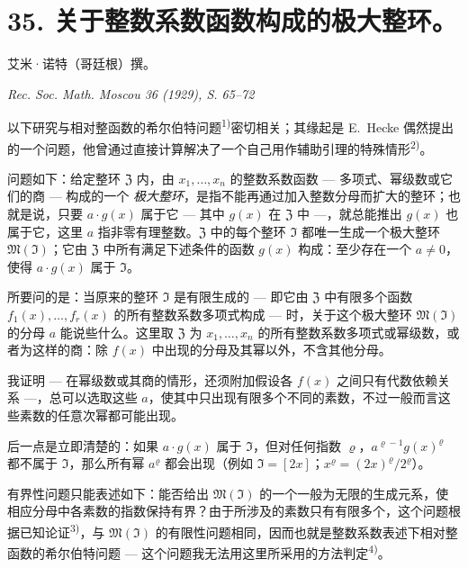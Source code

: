 \documentclass[11pt]{article}
\begin{document}
\setcounter{footnote}{0}
\section*{35. 关于整数系数函数构成的极大整环。}

\begin{center}
艾米·诺特（哥廷根）撰。\par
\emph{Rec. Soc. Math. Moscou 36 (1929), S. 65--72}
\end{center}




以下研究与相对整函数的希尔伯特问题\textsuperscript{1)}密切相关；其缘起是 E.\ Hecke 偶然提出的一个问题，他曾通过直接计算解决了一个自己用作辅助引理的特殊情形\textsuperscript{2)}。

问题如下：给定整环 $\mathfrak{Z}$ 内，由 $x_1,\ldots,x_n$ 的整数系数函数 --- 多项式、幂级数或它们的商 --- 构成的一个 \textit{极大整环}，是指不能再通过加入整数分母而扩大的整环；也就是说，只要 $a \cdot g(x)$ 属于它 --- 其中 $g(x)$ 在 $\mathfrak{Z}$ 中 ---，就总能推出 $g(x)$ 也属于它，这里 $a$ 指非零有理整数。$\mathfrak{Z}$ 中的每个整环 $\mathfrak{I}$ 都唯一生成一个极大整环 $\mathfrak{M}(\mathfrak{I})$；它由 $\mathfrak{Z}$ 中所有满足下述条件的函数 $g(x)$ 构成：至少存在一个 $a \neq 0$，使得 $a \cdot g(x)$ 属于 $\mathfrak{I}$。

所要问的是：当原来的整环 $\mathfrak{I}$ 是有限生成的 --- 即它由 $\mathfrak{Z}$ 中有限多个函数 $f_1(x),\ldots,f_r(x)$ 的所有整数系数多项式构成 --- 时，关于这个极大整环 $\mathfrak{M}(\mathfrak{I})$ 的分母 $a$ 能说些什么。这里取 $\mathfrak{Z}$ 为 $x_1,\ldots,x_n$ 的所有整数系数多项式或幂级数，或者为这样的商：除 $f(x)$ 中出现的分母及其幂以外，不含其他分母。

我证明 --- 在幂级数或其商的情形，还须附加假设各 $f(x)$ 之间只有代数依赖关系 ---，总可以选取这些 $a$，使其中只出现有限多个不同的素数，不过一般而言这些素数的任意次幂都可能出现。

后一点是立即清楚的：如果 $a\cdot g(x)$ 属于 $\mathfrak{I}$，但对任何指数 $\varrho$，$a^{\varrho-1}g(x)^{\varrho}$ 都不属于 $\mathfrak{I}$，那么所有幂 $a^{\varrho}$ 都会出现（例如 $\mathfrak{I}=[2x]$；$x^{\varrho}=(2x)^{\varrho}/2^{\varrho}$）。

有界性问题只能表述如下：能否给出 $\mathfrak{M}(\mathfrak{I})$ 的一个一般为无限的生成元系，使相应分母中各素数的指数保持有界？由于所涉及的素数只有有限多个，这个问题根据已知论证\textsuperscript{3)}，与 $\mathfrak{M}(\mathfrak{I})$ 的有限性问题相同，因而也就是整数系数表述下相对整函数的希尔伯特问题 --- 这个问题我无法用这里所采用的方法判定\textsuperscript{4)}。
\end{document}
